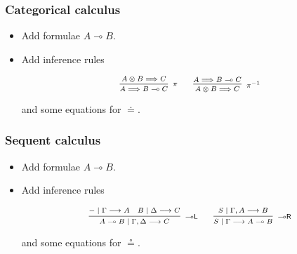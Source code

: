 \documentclass[10pt,t]{beamer}
\newcommand{\ot}{\otimes}
\newcommand{\tto}{\Longrightarrow}
\newcommand{\loL}{{\lo}\mathsf{L}}
\newcommand{\loR}{{\lo}\mathsf{R}}
\renewcommand{\vdash}{\longrightarrow}
\newcommand{\lo}{\multimap}
\newcommand{\lolli}{\lo}
\begin{document}
\begin{frame}

\frametitle{Categorical calculus}

\begin{itemize}

\item Add formulae $A \lolli B$.

\bigskip

\item Add inference rules 

\[
\scriptsize
\infer[\pi]{A \tto B \lolli C}{
  A \ot B \tto C
}
\qquad
\infer[\pi^{-1}]{A \ot B \tto C}{
  A \tto B \lolli C
}
\]

and some equations for $\doteq$.

\end{itemize}

\end{frame}


\begin{frame}

\frametitle{Sequent calculus}

\begin{itemize}

\item Add formulae $A \lolli B$.

\bigskip

\item Add inference rules 

\[
\scriptsize
    \infer[\loL]{A \lolli B \mid \Gamma , \Delta \vdash C}{
      {-} \mid \Gamma \vdash A
      &
      B \mid \Delta \vdash C
    }
    \qquad
    \infer[\loR]{S \mid \Gamma \vdash A \lolli B}{S \mid \Gamma , A \vdash B}
\]

and some equations for $\circeq$.

\end{itemize}

\end{frame}
\end{document}
